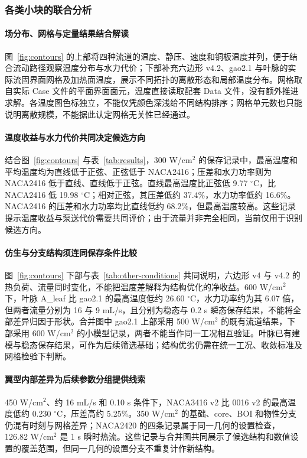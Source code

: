 \documentclass[stage2,fontset=fandol]{ydzjreport}
\begin{document}
\subsubsection{各类小块的联合分析}
\paragraph{场分布、网格与定量结果结合解读}
图~\ref{fig:contours} 的上部将四种流道的温度、静压、速度和铜板温度并列，便于结合流动路径观察温度分布与水力代价；下部补充六边形 v4.2、gao2.1 与叶脉的实际流固界面网格及加热面温度，展示不同拓扑的离散形态和局部温度分布。网格取自实际 Case 文件的平面界面面元，温度直接读取配套 Data 文件，没有额外推进求解。各温度图色标独立，不能仅凭颜色深浅给不同结构排序；网格单元数也只能说明离散规模，不能据此认定网格无关性已经通过。

\paragraph{温度收益与水力代价共同决定候选方向}
结合图~\ref{fig:contours} 与表~\ref{tab:results}，300 W/cm$^2$ 的保存记录中，最高温度和平均温度均为直线低于正弦、正弦低于 NACA2416；压差和水力功率则为 NACA2416 低于直线、直线低于正弦。直线最高温度比正弦低 9.77 $^\circ$C，比 NACA2416 低 19.98 $^\circ$C；相对正弦，其压差低约 37.4\%，水力功率低约 16.6\%。NACA2416 的压差和水力功率均比直线低约 68.2\%，但最高温度较高。这些记录提示温度收益与泵送代价需要共同评价；由于流量并非完全相同，当前仅用于识别候选方向。

\paragraph{仿生与分支结构须连同保存条件比较}
图~\ref{fig:contours} 下部与表~\ref{tab:other-conditions} 共同说明，六边形 v4 与 v4.2 的热负荷、流量同时变化，不能把温度差解释为结构优化的净收益。600 W/cm$^2$ 下，叶脉 A\_leaf 比 gao2.1 的最高温度低约 26.60 $^\circ$C，水力功率约为其 6.07 倍，但两者流量分别为 16 与 9 mL/s，且分别为稳态与 0.2 s 瞬态保存结果，不能将全部差异归因于形状。合并图中 gao2.1 上部采用 500 W/cm$^2$ 的既有流道结果，下部采用 600 W/cm$^2$ 的小模型记录，两者不能当作同一工况相互验证。叶脉已有建模与稳态保存结果，可作为后续筛选基础；结构优劣仍需在统一工况、收敛标准及网格检验下判断。

\paragraph{翼型内部差异为后续参数分组提供线索}
450 W/cm$^2$、约 16 mL/s 和 0.10 s 条件下，NACA3416 v2 比 0016 v2 的最高温度低约 0.230 $^\circ$C，压差高约 5.25\%。350 W/cm$^2$ 的基础、core、BOI 和物性分支仍混有时刻与网格差异；NACA2420 的四条记录属于同一几何的设置检查，126.82 W/cm$^2$ 是 1 s 瞬时热流。这些记录与合并图共同展示了候选结构和数值设置的覆盖范围，但同一几何的设置分支不重复计作新结构。
\end{document}
